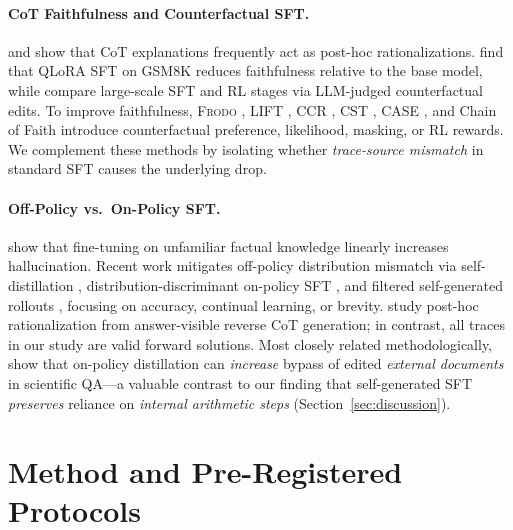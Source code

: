 \documentclass[11pt]{article}
\begin{document}
\paragraph{CoT Faithfulness and Counterfactual SFT.}
\citet{lanham2023measuring} and \citet{turpin2024language} show that CoT explanations frequently act as post-hoc rationalizations.
\citet{lobo2024impact} find that QLoRA SFT on GSM8K reduces faithfulness relative to the base model, while \citet{han2026rfeval} compare large-scale SFT and RL stages via LLM-judged counterfactual edits.
To improve faithfulness, \textsc{Frodo} \citep{paul2024frodo}, \textsc{LIFT} \citep{swaroop2025lift}, CCR \citep{akter2025ccr}, CST \citep{hase2026cst}, \textsc{CASE} \citep{wang2026case}, and Chain of Faith \citep{meng2026chainoffaith} introduce counterfactual preference, likelihood, masking, or RL rewards.
We complement these methods by isolating whether \emph{trace-source mismatch} in standard SFT causes the underlying drop.

\paragraph{Off-Policy vs.\ On-Policy SFT.}
\citet{gekhman2024does} show that fine-tuning on unfamiliar factual knowledge linearly increases hallucination.
Recent work mitigates off-policy distribution mismatch via self-distillation \citep{shenfeld2026sdft}, distribution-discriminant on-policy SFT \citep{zhang2026onpolicysft}, and filtered self-generated rollouts \citep{zhao2026onpolicyefficient}, focusing on accuracy, continual learning, or brevity.
\citet{peng2026posthoc} study post-hoc rationalization from answer-visible reverse CoT generation; in contrast, all traces in our study are valid forward solutions.
Most closely related methodologically, \citet{xu2026evidencebypass} show that on-policy distillation can \emph{increase} bypass of edited \emph{external documents} in scientific QA---a valuable contrast to our finding that self-generated SFT \emph{preserves} reliance on \emph{internal arithmetic steps} (Section~\ref{sec:discussion}).

\section{Method and Pre-Registered Protocols}
\label{sec:method}
\end{document}
